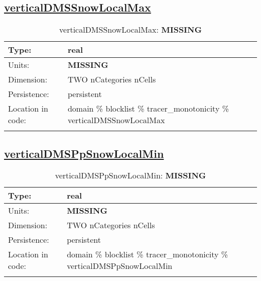 \subsection[verticalDMSSnowLocalMax]{\hyperref[sec:var_tab_tracer_monotonicity]{verticalDMSSnowLocalMax}}
\label{subsec:var_sec_tracer_monotonicity_verticalDMSSnowLocalMax}
\begin{center}
\begin{longtable}{| p{2.0in} | p{4.0in} |}
        \hline 
        Type: & real \\
        \hline 
        Units: & {\bf \color{red} MISSING} \\
        \hline 
        Dimension: & TWO nCategories nCells \\
        \hline 
        Persistence: & persistent \\
        \hline 
         Location in code: & domain \% blocklist \% tracer\_monotonicity \% verticalDMSSnowLocalMax \\
         \hline 
    \caption{verticalDMSSnowLocalMax: {\bf \color{red} MISSING}}
\end{longtable}
\end{center}
\subsection[verticalDMSPpSnowLocalMin]{\hyperref[sec:var_tab_tracer_monotonicity]{verticalDMSPpSnowLocalMin}}
\label{subsec:var_sec_tracer_monotonicity_verticalDMSPpSnowLocalMin}
\begin{center}
\begin{longtable}{| p{2.0in} | p{4.0in} |}
        \hline 
        Type: & real \\
        \hline 
        Units: & {\bf \color{red} MISSING} \\
        \hline 
        Dimension: & TWO nCategories nCells \\
        \hline 
        Persistence: & persistent \\
        \hline 
         Location in code: & domain \% blocklist \% tracer\_monotonicity \% verticalDMSPpSnowLocalMin \\
         \hline 
    \caption{verticalDMSPpSnowLocalMin: {\bf \color{red} MISSING}}
\end{longtable}
\end{center}
